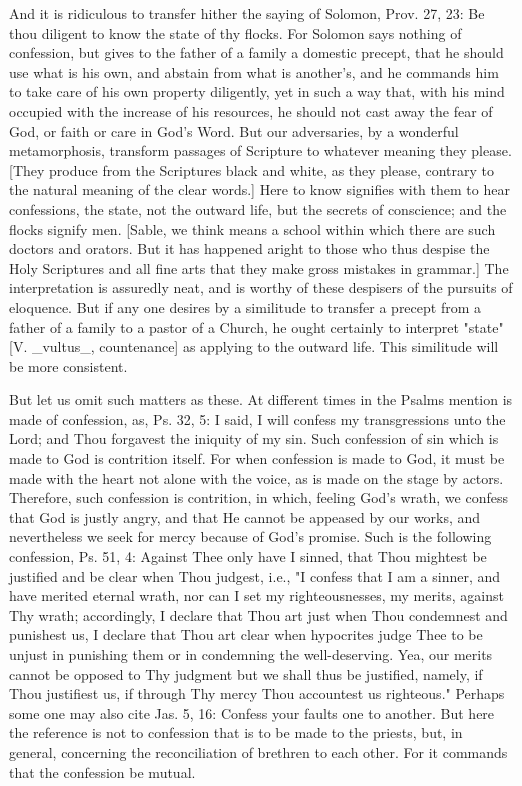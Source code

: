 And it is ridiculous to transfer hither the saying of Solomon, Prov.
27, 23: Be thou diligent to know the state of thy flocks.  For
Solomon says nothing of confession, but gives to the father of a
family a domestic precept, that he should use what is his own, and
abstain from what is another's, and he commands him to take care of
his own property diligently, yet in such a way that, with his mind
occupied with the increase of his resources, he should not cast away
the fear of God, or faith or care in God's Word.  But our adversaries,
by a wonderful metamorphosis, transform passages of Scripture to
whatever meaning they please.  [They produce from the Scriptures
black and white, as they please, contrary to the natural meaning of
the clear words.] Here to know signifies with them to hear
confessions, the state, not the outward life, but the secrets of
conscience; and the flocks signify men.  [Sable, we think means a
school within which there are such doctors and orators.  But it has
happened aright to those who thus despise the Holy Scriptures and all
fine arts that they make gross mistakes in grammar.] The
interpretation is assuredly neat, and is worthy of these despisers of
the pursuits of eloquence.  But if any one desires by a similitude to
transfer a precept from a father of a family to a pastor of a Church,
he ought certainly to interpret "state" [V. _vultus_, countenance] as
applying to the outward life.  This similitude will be more
consistent.

But let us omit such matters as these.  At different times in the
Psalms mention is made of confession, as, Ps. 32, 5: I said, I will
confess my transgressions unto the Lord; and Thou forgavest the
iniquity of my sin.  Such confession of sin which is made to God is
contrition itself.  For when confession is made to God, it must be
made with the heart not alone with the voice, as is made on the stage
by actors.  Therefore, such confession is contrition, in which,
feeling God's wrath, we confess that God is justly angry, and that He
cannot be appeased by our works, and nevertheless we seek for mercy
because of God's promise.  Such is the following confession, Ps. 51,
4: Against Thee only have I sinned, that Thou mightest be justified
and be clear when Thou judgest, i.e., "I confess that I am a sinner,
and have merited eternal wrath, nor can I set my righteousnesses, my
merits, against Thy wrath; accordingly, I declare that Thou art just
when Thou condemnest and punishest us, I declare that Thou art clear
when hypocrites judge Thee to be unjust in punishing them or in
condemning the well-deserving.  Yea, our merits cannot be opposed to
Thy judgment but we shall thus be justified, namely, if Thou
justifiest us, if through Thy mercy Thou accountest us righteous."
Perhaps some one may also cite Jas. 5, 16: Confess your faults one to
another.  But here the reference is not to confession that is to be
made to the priests, but, in general, concerning the reconciliation
of brethren to each other.  For it commands that the confession be
mutual.

